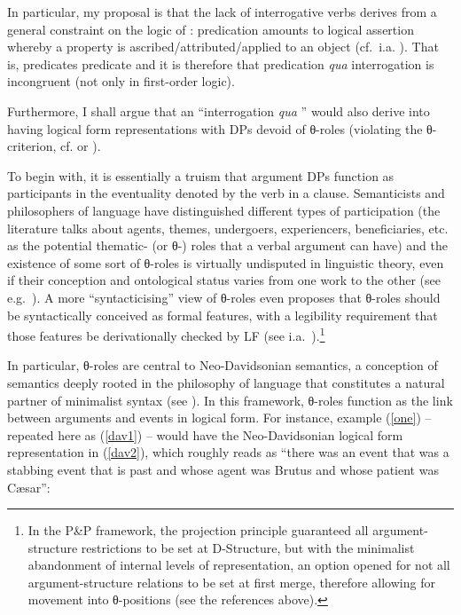 \documentclass[output=paper]{langsci/langscibook}
\begin{document}
In particular, my proposal is that the lack of interrogative verbs derives from
a general constraint on the logic of : predication amounts to
logical assertion whereby a property is ascribed/attributed/applied to an
object (cf.\ i.a.
\citealt{engel1989,parteeetal1990,mcginn2000,davidson2005,burge2007,liebesman2015}).
That is, predicates predicate and it is therefore that predication \emph{qua}
interrogation is incongruent (not only in first-order logic).\newpage

Furthermore, I shall argue that an ``interrogation \emph{qua} ''
would also derive into having logical form representations with DPs devoid of
θ-roles (violating the θ-criterion,  cf.
\citealt{Chomsky1981} or \citealt{Higginbotham1985}).

To begin with, it is essentially a truism that argument DPs function as
participants in the eventuality denoted by the verb in a clause. Semanticists
and philosophers of language have distinguished different types of
participation (the literature talks about agents, themes, undergoers,
experiencers, beneficiaries, etc. as the potential thematic- (or θ-)
roles that a verbal argument can have) and the existence of some sort of
θ-roles is virtually undisputed in linguistic theory, even if their
conception and ontological status varies from one work to the other (see
e.g.\ \citealt{carlson1984,Dowty1989,parsons1995}). A more
``syntacticising'' view of θ-roles even proposes that θ-roles
should be syntactically conceived as formal features, with a legibility
requirement that those features be derivationally checked by \gls{LF} (see
i.a.\
\citealt{boskovic.takahashi1998,hornstein1999,lasnik1999,manzini.roussou2000,fanselow2001,bagchi2007}).\footnote{In
    the P\&P framework, the projection principle guaranteed all
    argument-structure restrictions to be set at D-Structure, but with the
    minimalist abandonment of internal levels of representation, an option
    opened for not all argument-structure relations to be set at first merge,
    therefore allowing for movement into θ-positions (see the references
above).}

In particular, θ-roles are central to Neo-Davidsonian semantics, a
conception of semantics deeply rooted in the philosophy of language that
constitutes a natural partner of minimalist syntax (see
\citealt{Parsons1990,parsons1995,herburger2000,hornstein2002,pietroski2002,pietroski2003,pietroski2005,schein2002,irurtzun2007,Lohndal2014}).
In this framework, θ-roles\is{thematic roles} function as the link between arguments and
events in logical form. For instance, example (\ref{one}) -- repeated here as
(\ref{dav1}) -- would have the Neo-Davidsonian logical form representation in
(\ref{dav2}), which roughly reads as ``there was an event that was a stabbing
event that is past and whose agent was Brutus and whose patient was
C\ae{}sar'':
\end{document}
